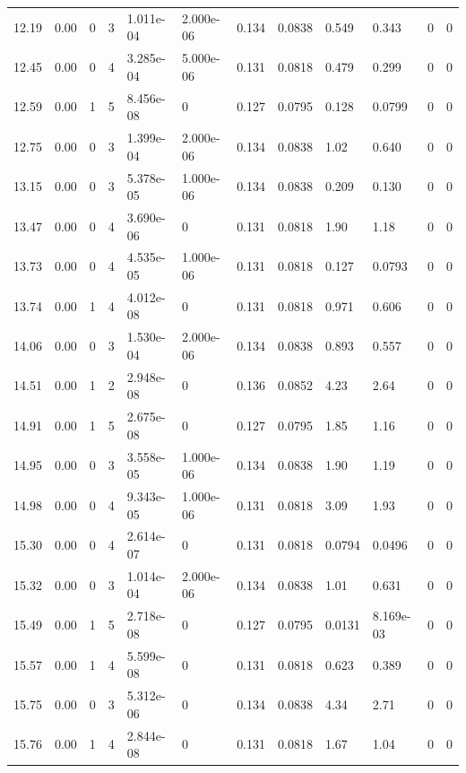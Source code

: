 \documentclass[preview]{standalone}
\begin{document}
{{{\begin{tabular}{L{1.2cm}C{1.2cm} C{0.3cm}C{0.5cm} C{1.4cm}C{1.4cm} C{1.4cm}C{1.4cm} C{1.6cm}C{1.6cm} C{1.6cm}C{1.6cm}}
  12.19  &  0.00  & 0     &  3 &  1.011e-04  & 2.000e-06  &  0.134&   0.0838& 0.549 & 0.343   &  0 & 0  \\ 
  12.45  &  0.00  & 0     &  4 &  3.285e-04  & 5.000e-06  &  0.131&   0.0818& 0.479 & 0.299   &  0 & 0  \\ 
  12.59  &  0.00  & 1     &  5 &  8.456e-08  & 0  &  0.127&   0.0795& 0.128 & 0.0799   &  0 & 0  \\ 
  12.75  &  0.00  & 0     &  3 &  1.399e-04  & 2.000e-06  &  0.134&   0.0838& 1.02 & 0.640   &  0 & 0  \\ 
  13.15  &  0.00  & 0     &  3 &  5.378e-05  & 1.000e-06  &  0.134&   0.0838& 0.209 & 0.130   &  0 & 0  \\ 
  13.47  &  0.00  & 0     &  4 &  3.690e-06  & 0  &  0.131&   0.0818& 1.90 & 1.18   &  0 & 0  \\ 
  13.73  &  0.00  & 0     &  4 &  4.535e-05  & 1.000e-06  &  0.131&   0.0818& 0.127 & 0.0793   &  0 & 0  \\ 
  13.74  &  0.00  & 1     &  4 &  4.012e-08  & 0  &  0.131&   0.0818& 0.971 & 0.606   &  0 & 0  \\ 
  14.06  &  0.00  & 0     &  3 &  1.530e-04  & 2.000e-06  &  0.134&   0.0838& 0.893 & 0.557   &  0 & 0  \\ 
  14.51  &  0.00  & 1     &  2 &  2.948e-08  & 0  &  0.136&   0.0852& 4.23 & 2.64   &  0 & 0  \\ 
  14.91  &  0.00  & 1     &  5 &  2.675e-08  & 0  &  0.127&   0.0795& 1.85 & 1.16   &  0 & 0  \\ 
  14.95  &  0.00  & 0     &  3 &  3.558e-05  & 1.000e-06  &  0.134&   0.0838& 1.90 & 1.19   &  0 & 0  \\ 
  14.98  &  0.00  & 0     &  4 &  9.343e-05  & 1.000e-06  &  0.131&   0.0818& 3.09 & 1.93   &  0 & 0  \\ 
  15.30  &  0.00  & 0     &  4 &  2.614e-07  & 0  &  0.131&   0.0818& 0.0794 & 0.0496   &  0 & 0  \\ 
  15.32  &  0.00  & 0     &  3 &  1.014e-04  & 2.000e-06  &  0.134&   0.0838& 1.01 & 0.631   &  0 & 0  \\ 
  15.49  &  0.00  & 1     &  5 &  2.718e-08  & 0  &  0.127&   0.0795& 0.0131 & 8.169e-03   &  0 & 0  \\ 
  15.57  &  0.00  & 1     &  4 &  5.599e-08  & 0  &  0.131&   0.0818& 0.623 & 0.389   &  0 & 0  \\ 
  15.75  &  0.00  & 0     &  3 &  5.312e-06  & 0  &  0.134&   0.0838& 4.34 & 2.71   &  0 & 0  \\ 
  15.76  &  0.00  & 1     &  4 &  2.844e-08  & 0  &  0.131&   0.0818& 1.67 & 1.04   &  0 & 0  \\ 

\end{tabular}}}}
\end{document}
